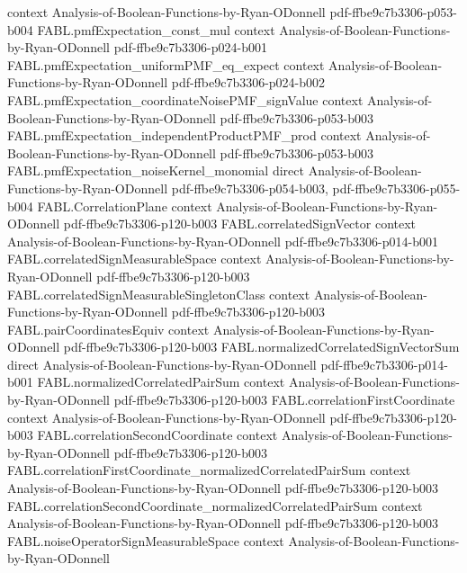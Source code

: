 \begin{theorem}
  {context}
  {Analysis-of-Boolean-Functions-by-Ryan-ODonnell}
  {pdf-ffbe9c7b3306-p053-b004}
\proofstep
  {FABL.pmfExpectation_const_mul}
  {context}
  {Analysis-of-Boolean-Functions-by-Ryan-ODonnell}
  {pdf-ffbe9c7b3306-p024-b001}
\proofstep
  {FABL.pmfExpectation_uniformPMF_eq_expect}
  {context}
  {Analysis-of-Boolean-Functions-by-Ryan-ODonnell}
  {pdf-ffbe9c7b3306-p024-b002}
\proofstep
  {FABL.pmfExpectation_coordinateNoisePMF_signValue}
  {context}
  {Analysis-of-Boolean-Functions-by-Ryan-ODonnell}
  {pdf-ffbe9c7b3306-p053-b003}
\proofstep
  {FABL.pmfExpectation_independentProductPMF_prod}
  {context}
  {Analysis-of-Boolean-Functions-by-Ryan-ODonnell}
  {pdf-ffbe9c7b3306-p053-b003}
\proofstep
  {FABL.pmfExpectation_noiseKernel_monomial}
  {direct}
  {Analysis-of-Boolean-Functions-by-Ryan-ODonnell}
  {pdf-ffbe9c7b3306-p054-b003,
    pdf-ffbe9c7b3306-p055-b004}
\proofstep
  {FABL.CorrelationPlane}
  {context}
  {Analysis-of-Boolean-Functions-by-Ryan-ODonnell}
  {pdf-ffbe9c7b3306-p120-b003}
\proofstep
  {FABL.correlatedSignVector}
  {context}
  {Analysis-of-Boolean-Functions-by-Ryan-ODonnell}
  {pdf-ffbe9c7b3306-p014-b001}
\proofstep
  {FABL.correlatedSignMeasurableSpace}
  {context}
  {Analysis-of-Boolean-Functions-by-Ryan-ODonnell}
  {pdf-ffbe9c7b3306-p120-b003}
\proofstep
  {FABL.correlatedSignMeasurableSingletonClass}
  {context}
  {Analysis-of-Boolean-Functions-by-Ryan-ODonnell}
  {pdf-ffbe9c7b3306-p120-b003}
\proofstep
  {FABL.pairCoordinatesEquiv}
  {context}
  {Analysis-of-Boolean-Functions-by-Ryan-ODonnell}
  {pdf-ffbe9c7b3306-p120-b003}
\proofstep
  {FABL.normalizedCorrelatedSignVectorSum}
  {direct}
  {Analysis-of-Boolean-Functions-by-Ryan-ODonnell}
  {pdf-ffbe9c7b3306-p014-b001}
\proofstep
  {FABL.normalizedCorrelatedPairSum}
  {context}
  {Analysis-of-Boolean-Functions-by-Ryan-ODonnell}
  {pdf-ffbe9c7b3306-p120-b003}
\proofstep
  {FABL.correlationFirstCoordinate}
  {context}
  {Analysis-of-Boolean-Functions-by-Ryan-ODonnell}
  {pdf-ffbe9c7b3306-p120-b003}
\proofstep
  {FABL.correlationSecondCoordinate}
  {context}
  {Analysis-of-Boolean-Functions-by-Ryan-ODonnell}
  {pdf-ffbe9c7b3306-p120-b003}
\proofstep
  {FABL.correlationFirstCoordinate_normalizedCorrelatedPairSum}
  {context}
  {Analysis-of-Boolean-Functions-by-Ryan-ODonnell}
  {pdf-ffbe9c7b3306-p120-b003}
\proofstep
  {FABL.correlationSecondCoordinate_normalizedCorrelatedPairSum}
  {context}
  {Analysis-of-Boolean-Functions-by-Ryan-ODonnell}
  {pdf-ffbe9c7b3306-p120-b003}
\proofstep
  {FABL.noiseOperatorSignMeasurableSpace}
  {context}
  {Analysis-of-Boolean-Functions-by-Ryan-ODonnell}

\end{theorem}
